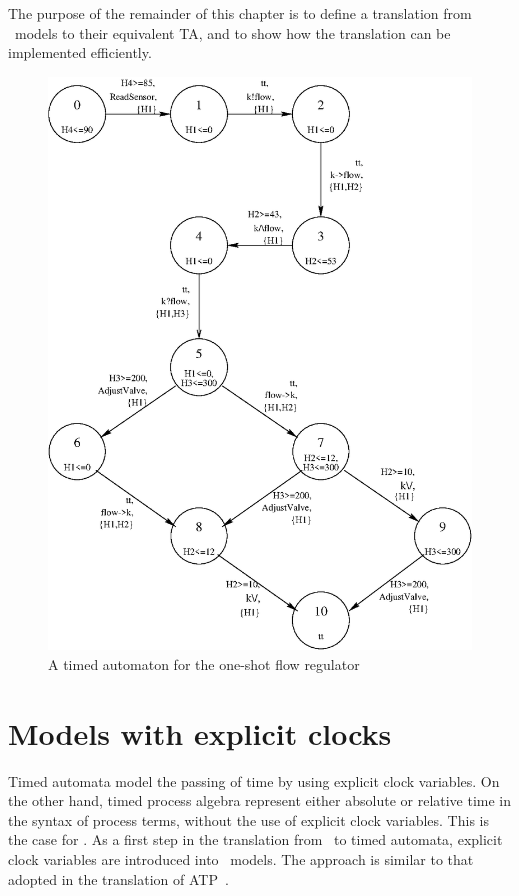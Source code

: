 The purpose of the remainder of this chapter is to define a translation from 
\bcandle\ models to their equivalent TA, and to show how the translation
can be implemented efficiently.

\begin{figure}
\begin{center}
\includegraphics[height=.5\textheight]{TGGEN/tg.eps} %
\end{center}
\caption{A timed automaton for the one-shot flow regulator\label{fig:tgflowoneshotta}}
\end{figure}  

\section{Models with explicit clocks\label{sec:tgexpclocks}}
Timed automata model the passing of time by using explicit clock
variables.  On the other hand, timed process algebra represent either
absolute or relative time in the syntax of process terms, without the
use of explicit clock variables. This is the case for \bcandle.  As a
first step in the translation from \bcandle\ to timed automata,
explicit clock variables are introduced into \bcandle\ models. The
approach is similar to that adopted in the translation of ATP~\cite{nic:92}.

